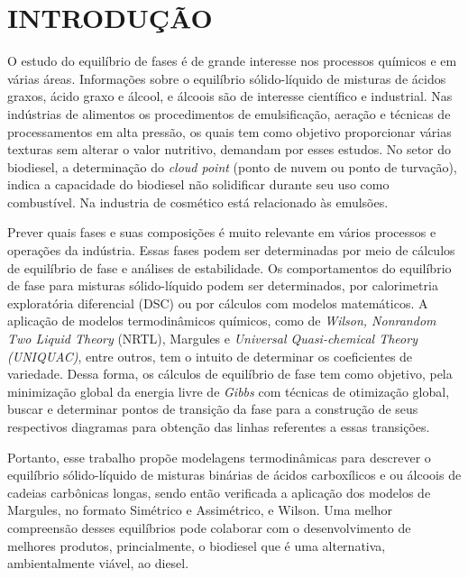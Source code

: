 
\chapter{INTRODUÇÃO}
\label{chap:introducao}

O estudo do equilíbrio de fases é de grande interesse nos processos químicos e em várias áreas. Informações sobre o equilíbrio sólido-líquido de misturas de ácidos graxos, ácido graxo e álcool, e álcoois são de interesse científico e industrial.  Nas indústrias de alimentos os procedimentos de emulsificação, aeração e técnicas de processamentos em alta pressão,  os quais tem como objetivo proporcionar várias texturas sem alterar o valor nutritivo, demandam por esses estudos. No setor do biodiesel, a determinação do \textit{cloud point} (ponto de nuvem ou ponto de turvação), indica a capacidade do biodiesel não solidificar durante seu uso como combustível. Na industria de cosmético está relacionado às emulsões. \cite{Leggieri2018a,Costa2007,Costa2009,Rocha2009a,Prausnitz,Rocha2011}

Prever quais fases e suas composições é  muito relevante em vários processos e operações da indústria. Essas fases podem ser  determinadas por meio de cálculos de equilíbrio de fase e análises de estabilidade. Os comportamentos do equilíbrio de fase para misturas sólido-líquido podem ser determinados, por calorimetria exploratória diferencial (DSC) ou por cálculos com modelos matemáticos. A aplicação de  modelos termodinâmicos químicos, como de  \textit{Wilson, Nonrandom Two Liquid Theory} (NRTL), Margules e \textit{Universal Quasi-chemical Theory (UNIQUAC)}, entre outros, tem o intuito de determinar os coeficientes de variedade. Dessa forma, os cálculos de equilíbrio de fase tem como objetivo, pela  minimização global da energia livre de \textit{Gibbs} com técnicas de otimização global, buscar e determinar pontos de transição da fase para a construção de seus respectivos diagramas para obtenção das linhas referentes a essas transições. \cite{Muller2019,Costa2009,Rocha2011,Farajnezhad2016}

 Portanto, esse trabalho propõe modelagens termodinâmicas para descrever o equilíbrio sólido-líquido de misturas binárias de ácidos carboxílicos e ou álcoois de  cadeias carbônicas longas, sendo então verificada a aplicação dos modelos de Margules, no formato Simétrico e Assimétrico, e Wilson. Uma melhor compreensão  desses equilíbrios  pode colaborar com o desenvolvimento  de  melhores  produtos,  princialmente,   o biodiesel que é uma alternativa, ambientalmente viável,  ao diesel.
